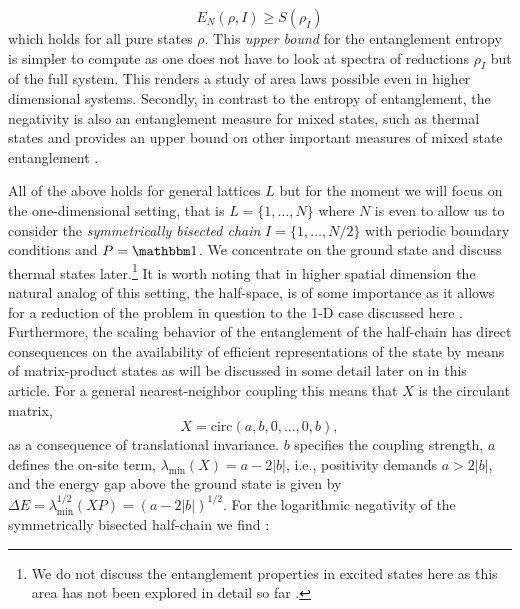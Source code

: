 \documentclass[12pt, rmp,floatfix,epsfig,graphics]{revtex4} %
\begin{document}
\begin{equation}
        E_{N}(\rho,I) \geq S(\rho_I)\label{logengineq}
\end{equation}
which holds for all pure states $\rho$. This {\it upper bound} 
for the entanglement entropy is simpler to compute as one does 
not have to look at spectra of reductions $\rho_I$ but of the 
full system. This renders a study of area laws possible even in 
higher dimensional systems. Secondly, in contrast to the entropy
of entanglement, the negativity is also an entanglement measure 
for mixed states, such as thermal states and provides an upper
bound on other important measures of mixed state entanglement \cite{VedralP98,Bennett,ChristandlW04,InHouseReview}.

All of the above holds for general lattices $L$ but for the moment 
we will focus on the one-dimensional setting, that is 
$L=\{1,\dots, N\}$ where $N$ is even to allow us to consider 
the {\it symmetrically bisected chain} $I=\{1,\dots, N/2\}$ with 
periodic boundary conditions and $P=\id$. We concentrate on
the ground state and discuss thermal states
 later.\footnote{We do not discuss the entanglement
properties in excited states here as this area has not been 
explored in detail so far \cite{Excited,Buzek04}.} It is worth noting
that in higher spatial dimension the natural analog of this
setting, the half-space, is of some importance as it allows 
for a reduction of the problem in question to the 1-D case 
discussed here \cite{Halfspace}. Furthermore, the scaling 
behavior of the entanglement of the half-chain has 
direct consequences on the availability of efficient 
representations of the state by means of matrix-product states
as will be discussed in some detail later on in this article.
For a general nearest-neighbor 
coupling this means that $X$ is the circulant matrix, 
\begin{equation}\label{HC}
        X=\text{circ}(a,b,0,\dots, 0,b),
\end{equation}
as a consequence of translational invariance. $b$ 
specifies the coupling strength, $a$ defines the on-site
term, $\lambda_{\text{min}}(X)=a-2|b|$, i.e., positivity
demands $a>2|b|$, and the energy gap above the ground state
is given by  $\Delta E = \lambda^{1/2}_{\text{min}}(XP ) = 
(a-2|b|)^{1/2}$. For the logarithmic negativity of the 
symmetrically bisected half-chain we find \cite{Harmonic}:
\end{document}
